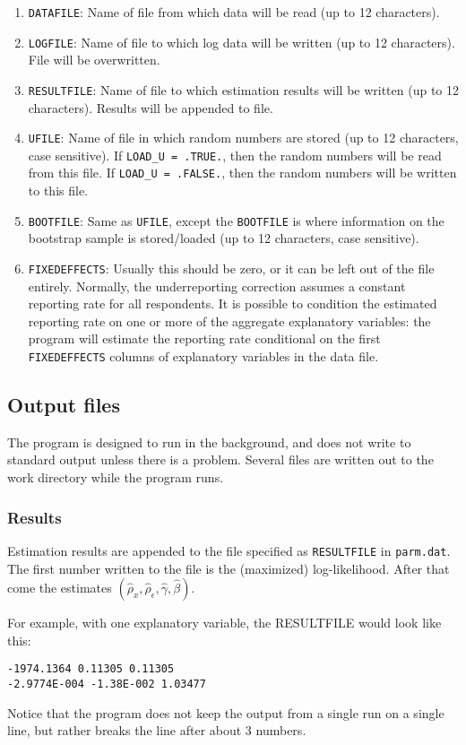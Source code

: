 \documentclass{article}
\begin{document}
\begin{enumerate}
\item {\tt DATAFILE}: Name of file from which data will be read (up to 12 characters).
\item {\tt LOGFILE}: Name of file to which log data will be written (up to 12 characters).
	File will be overwritten.
\item {\tt RESULTFILE}: Name of file to which estimation results will be written (up to 12 characters).  Results
	will be appended to file.
\item {\tt UFILE}: Name of file in which random numbers are stored (up to 12 characters, case sensitive).  
	If {\tt LOAD\_U = .TRUE.}, then the random numbers will be read from this file.  If 
	{\tt LOAD\_U = .FALSE.}, then the random numbers will be written to this file.
\item {\tt BOOTFILE}: Same as {\tt UFILE}, except the {\tt BOOTFILE} is where information on the bootstrap sample is stored/loaded 
	(up to 12 characters, case sensitive).
\item {\tt FIXEDEFFECTS}: Usually this should be zero, or it can be left out of the file entirely.
	Normally, the underreporting correction assumes a constant reporting rate for all respondents.
	It is possible to condition the estimated reporting rate on one or more of the aggregate
	explanatory variables: the program will estimate the reporting rate conditional
	on the first {\tt FIXEDEFFECTS} columns of explanatory variables in the data file.
\end{enumerate}

\subsection{Output files}\label{sec:output_smle}

The program is designed to run in the background, and does not write to standard output unless there is 
a problem.  Several files are written out to the work directory while the program runs.

\subsubsection{Results}

Estimation results are appended to the file specified as {\tt RESULTFILE} in {\tt parm.dat}.
The first number written to the file is the (maximized) log-likelihood.  After that come 
the estimates $(\hat{\rho}_x,\hat{\rho}_{\epsilon},\hat{\gamma},\hat{\beta})$.

For example, with one explanatory variable, the RESULTFILE would look like this:
{\scriptsize
\begin{verbatim}
-1974.1364 0.11305 0.11305
-2.9774E-004 -1.38E-002 1.03477	
\end{verbatim}}
Notice that the program does not keep the output from a single run on a single line,
but rather breaks the line after about 3 numbers.
\end{document}
